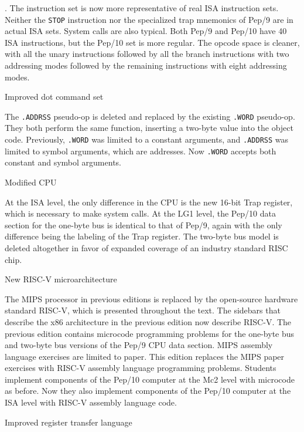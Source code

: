 \documentclass[10pt,fleqn]{book}
\newenvironment{exercises}
   {\begin{list}
      {\arabic{ecounter}.}
      {
         \usecounter{ecounter}
         \setcounter {ecounter}{0}
         \setlength\leftmargin{2pc}
         \setlength\labelwidth{6pc}
         \setlength\labelsep{1pc}
      }}
   {\end{list}}
\newcounter{ecounter}
\begin{document}
\begin{exercises}
The instruction set is now more representative of real ISA instruction sets.
Neither the \verb|STOP| instruction nor the specialized trap mnemonics of Pep/9 are in actual ISA sets.
System calls are also typical.
Both Pep/9 and Pep/10 have 40 ISA instructions, but the Pep/10 set is more regular.
The opcode space is cleaner, with all the unary instructions followed by all the branch instructions with two addressing modes
followed by the remaining instructions with eight addressing modes.

\item Improved dot command set

The \verb|.ADDRSS| pseudo-op is deleted and replaced by the existing \verb|.WORD| pseudo-op.
They both perform the same function, inserting a two-byte value into the object code.
Previously, \verb|.WORD| was limited to a constant arguments, and \verb|.ADDRSS| was limited to symbol arguments, which are addresses.
Now \verb|.WORD| accepts both constant and symbol arguments.

\item Modified CPU

At the ISA level, the only difference in the CPU is the new 16-bit Trap register, which is necessary to make system calls.
At the LG1 level, the Pep/10 data section for the one-byte bus is identical to that of Pep/9, again with the only difference being the labeling of the Trap register.
The two-byte bus model is deleted altogether in favor of expanded coverage of an industry standard RISC chip.

\item New RISC-V microarchitecture

The MIPS processor in previous editions is replaced by the open-source hardware standard RISC-V, which is presented throughout the text.
The sidebars that describe the x86 architecture in the previous edition now describe RISC-V.
The previous edition contains microcode programming problems for the one-byte bus and two-byte bus versions of the Pep/9 CPU data section.
MIPS assembly language exercises are limited to paper.
This edition replaces the MIPS paper exercises with RISC-V assembly language programming problems.
Students implement components of the Pep/10 computer at the Mc2 level with microcode as before.
Now they also implement components of the Pep/10 computer at the ISA level with RISC-V assembly language code.

\item Improved register transfer language


\end{exercises}
\end{document}
